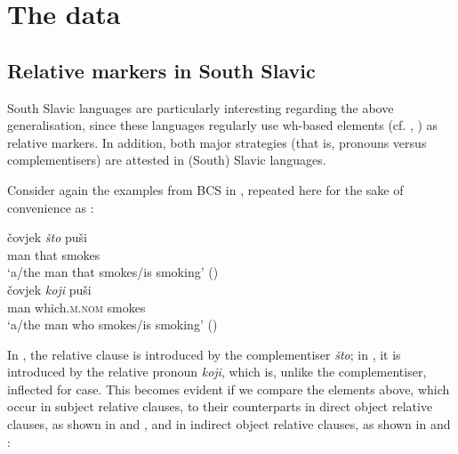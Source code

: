 \documentclass[output=paper]{langscibook}
\begin{document}
\section{The data} \label{bacsk:sec:data}
\subsection{Relative markers in South Slavic} \label{bacsk:sec:relativemarkers}
South Slavic languages are particularly interesting regarding the above generalisation, since these languages regularly use wh-based elements (cf. \citealt[36]{kljajevic2012}, \citealt{auderset2020}) as relative markers. In addition, both major strategies (that is, pronouns versus complementisers) are attested in (South) Slavic languages.

Consider again the examples from BCS in , repeated here for the sake of convenience as :

\ea \label{bacsk:ex:screpeat}
\ea \gll čovjek \textit{što} puši \label{bacsk:ex:scsto}\\
man that smokes\\
\glt `a/the man that smokes/is smoking' \hfill (\citealt[27]{gracaninyuksek2013})\\
\ex \gll čovjek \textit{koji} puši \label{bacsk:ex:sckoji}\\
man which.\textsc{m.nom} smokes\\
\glt `a/the man who smokes/is smoking' \hfill (\citealt[26]{gracaninyuksek2013})
\z
\z

\noindent In , the relative clause is introduced by the complementiser \textit{što}; in , it is introduced by the relative pronoun \textit{koji}, which is, unlike the complementiser, inflected for case. This becomes evident if we compare the elements above, which occur in subject relative clauses, to their counterparts in direct object relative clauses, as shown in  and , and in indirect object relative clauses, as shown in  and :
\end{document}

